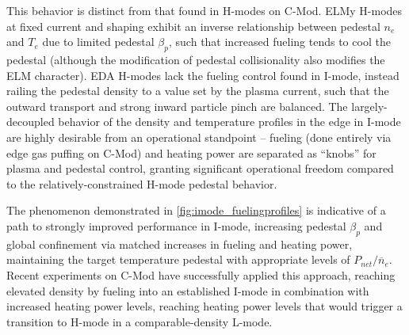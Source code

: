 This behavior is distinct from that found in H-modes on C-Mod.  ELMy H-modes at fixed current and shaping exhibit an inverse relationship between pedestal $n_e$ and $T_e$ due to limited pedestal $\beta_p$, such that increased fueling tends to cool the pedestal (although the modification of pedestal collisionality also modifies the ELM character).  EDA H-modes lack the fueling control found in I-mode, instead railing the pedestal density to a value set by the plasma current, such that the outward transport and strong inward particle pinch are balanced.  The largely-decoupled behavior of the density and temperature profiles in the edge in I-mode are highly desirable from an operational standpoint -- fueling (done entirely via edge gas puffing on C-Mod) and heating power are separated as ``knobs'' for plasma and pedestal control, granting significant operational freedom compared to the relatively-constrained H-mode pedestal behavior.

The phenomenon demonstrated in \cref{fig:imode_fuelingprofiles} is indicative of a path to strongly improved performance in I-mode, increasing pedestal $\beta_p$ and global confinement via matched increases in fueling and heating power, maintaining the target temperature pedestal with appropriate levels of $P_{net}/\overline{n}_e$.  Recent experiments on C-Mod \cite{Hubbard2012} have successfully applied this approach, reaching elevated density by fueling into an established I-mode in combination with increased heating power levels, reaching heating power levels that would trigger a transition to H-mode in a comparable-density L-mode.

\begin{figure}[h]
 \pushtooutside
\end{figure}

